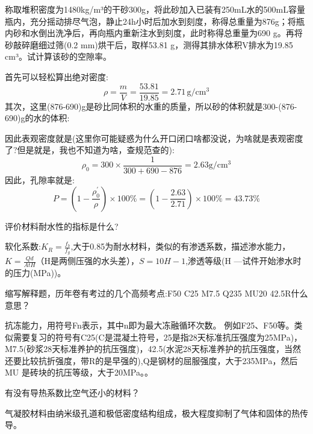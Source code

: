 \documentclass[12pt, a4paper, oneside, UTF8]{ctexbook}
\begin{document}
\begin{example}
    称取堆积密度为1480kg/m³的干砂300g，将此砂加入已装有250mL水的500mL容量瓶内，充分摇动排尽气泡，静止24h小时后加水到刻度，称得总重量为876g；将瓶内砂和水倒出洗净后，再向瓶内重新注水到刻度，此时称得总重量为690 g。再将砂敲碎磨细过筛(0.2 mm)烘干后，取样53.81 g，测得其排水体积V排水为19.85 cm³。试计算该砂的空隙率。

    首先可以轻松算出绝对密度:
    \[
    \rho = \frac{m}{V} = \frac{53.81}{19.85} = 2.71\,\mathrm{g}/\mathrm{cm}^3
    \]
    其次，这里(876-690)g是砂比同体积的水重的质量，所以砂的体积就是300-(876-690)g的水的体积: 
    
    因此表观密度就是(这里你可能疑惑为什么开口闭口啥都没说，为啥就是表观密度了?但是就是，我也不知道为啥，查规范查的):
    \[
    \rho_0 = 300 \times \frac{1}{300 + 690 - 876} = 2.63\text{g}/\text{cm}^3
    \]
    因此，孔隙率就是:
    \[
    P = \left(1 - \frac{\rho_0^{\prime}}{\rho}\right) \times 100\% = \left(1 - \frac{2.63}{2.71}\right) \times 100\% = 43.73\%
    \]
\end{example}

\begin{example}
    评价材料耐水性的指标是什么?

    软化系数:$K_R=\frac{f_b}{f_g}$,大于0.85为耐水材料，类似的有渗透系数，描述渗水能力，$K=\frac{Qd}{AtH}$（H是两侧压强的水头差），$S=10H-1$,渗透等级(H —试件开始渗水时的压力(MPa))。
\end{example}

\begin{example}
    缩写解释题，历年卷有考过的几个高频考点:F50 C25 M7.5 Q235 MU20 42.5R什么意思？

    抗冻能力，用符号Fn表示，其中n即为最大冻融循环次数。 例如F25、F50等。类似需要复习的符号有C25(C是混凝土符号，25是指28天标准抗压强度为25MPa)，M7.5(砂浆28天标准养护的抗压强度)，42.5(水泥28天标准养护的抗压强度，当然还要比较抗折强度，带R的是早强的),Q是钢材的屈服强度，大于235MPa，然后MU 是砖块的抗压等级，大于20MPa。。
\end{example}

\begin{example}
    有没有导热系数比空气还小的材料？

气凝胶材料由纳米级孔道和极低密度结构组成，极大程度抑制了气体和固体的热传导。
\end{example}


\ifx\allfiles\undefined
\end{document}
